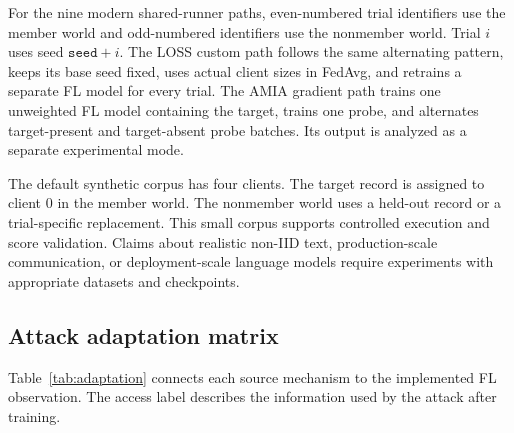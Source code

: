 \documentclass[11pt]{article}
\begin{document}
For the nine modern shared-runner paths, even-numbered trial identifiers use the member world and odd-numbered identifiers use the nonmember world. Trial $i$ uses seed $\texttt{seed}+i$. The LOSS custom path follows the same alternating pattern, keeps its base seed fixed, uses actual client sizes in FedAvg, and retrains a separate FL model for every trial. The AMIA gradient path trains one unweighted FL model containing the target, trains one probe, and alternates target-present and target-absent probe batches. Its output is analyzed as a separate experimental mode.

The default synthetic corpus has four clients. The target record is assigned to client 0 in the member world. The nonmember world uses a held-out record or a trial-specific replacement. This small corpus supports controlled execution and score validation. Claims about realistic non-IID text, production-scale communication, or deployment-scale language models require experiments with appropriate datasets and checkpoints.

\subsection{Attack adaptation matrix}

Table~\ref{tab:adaptation} connects each source mechanism to the implemented FL observation. The access label describes the information used by the attack after training.
\end{document}
